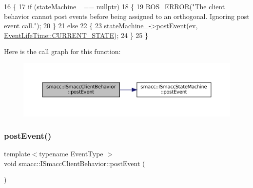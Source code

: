 \begin{DoxyCode}
16 \{
17     \textcolor{keywordflow}{if} (\hyperlink{classsmacc_1_1ISmaccClientBehavior_a0fea65db292a8bb3dfba3e5840491d79}{stateMachine\_} == \textcolor{keyword}{nullptr})
18     \{
19         ROS\_ERROR(\textcolor{stringliteral}{"The client behavior cannot post events before being assigned to an orthogonal. Ignoring
       post event call."});
20     \}
21     \textcolor{keywordflow}{else}
22     \{
23         \hyperlink{classsmacc_1_1ISmaccClientBehavior_a0fea65db292a8bb3dfba3e5840491d79}{stateMachine\_}->\hyperlink{classsmacc_1_1ISmaccStateMachine_afcb6a216441aeaea2cba4e1ab12c366b}{postEvent}(ev, 
      \hyperlink{namespacesmacc_a5063f47926ad2fe25120ed4b1e7b2c7ea49b599d413671f16f08d0dd18243c294}{EventLifeTime::CURRENT\_STATE});
24     \}
25 \}
\end{DoxyCode}
Here is the call graph for this function\+:
\nopagebreak
\begin{figure}[H]
\begin{center}
\leavevmode
\includegraphics[width=350pt]{classsmacc_1_1ISmaccClientBehavior_af8c7fc75e85d717ecee0dcd254f71681_cgraph}
\end{center}
\end{figure}
\mbox{\label{classsmacc_1_1ISmaccClientBehavior_a5db577c585935114058770f2b7242f8a}} 
\subsubsection{\texorpdfstring{post\+Event()}{postEvent()}\hspace{0.1cm}{\footnotesize\ttfamily [2/2]}}
{\footnotesize\ttfamily template$<$typename Event\+Type $>$ \\
void smacc\+::\+I\+Smacc\+Client\+Behavior\+::post\+Event (\begin{DoxyParamCaption}{ }\end{DoxyParamCaption})\hspace{0.3cm}{\ttfamily [protected]}}



